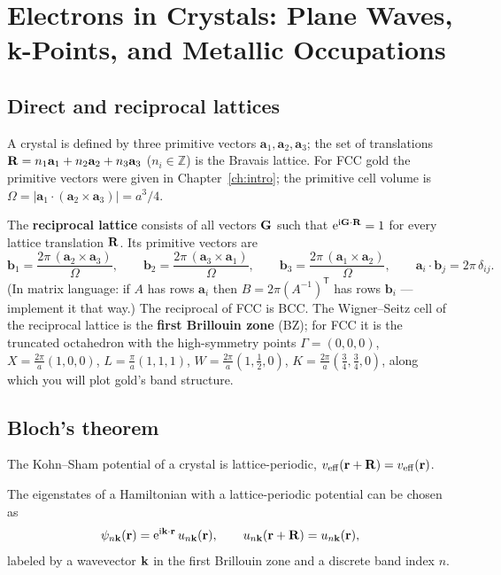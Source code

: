 \chapter{Electrons in Crystals: Plane Waves, k-Points, and Metallic Occupations}
\label{ch:solids}

\section{Direct and reciprocal lattices}

A crystal is defined by three primitive vectors $\mathbf a_1, \mathbf a_2,
\mathbf a_3$; the set of translations $\mathbf{R} = n_1\mathbf a_1 + n_2\mathbf a_2
+ n_3 \mathbf a_3$ ($n_i \in \mathbb Z$) is the Bravais lattice. For FCC gold
the primitive vectors were given in Chapter~\ref{ch:intro}; the primitive
cell volume is $\Omega = |\mathbf a_1 \cdot (\mathbf a_2 \times \mathbf
a_3)| = a^3/4$.

The \textbf{reciprocal lattice} consists of all vectors $\mathbf{G}$ such that
$\mathrm{e}^{\mathrm{i} \mathbf{G}\cdot\mathbf{R}} = 1$ for every lattice translation $\mathbf{R}$. Its
primitive vectors are
\begin{equation}
\mathbf b_1 = \frac{2\pi\, (\mathbf a_2 \times \mathbf a_3)}{\Omega},
\qquad
\mathbf b_2 = \frac{2\pi\, (\mathbf a_3 \times \mathbf a_1)}{\Omega},
\qquad
\mathbf b_3 = \frac{2\pi\, (\mathbf a_1 \times \mathbf a_2)}{\Omega},
\qquad
\mathbf a_i \cdot \mathbf b_j = 2\pi\, \delta_{ij}.
\end{equation}
(In matrix language: if $A$ has rows $\mathbf a_i$ then $B = 2\pi
(A^{-1})^{\mathsf T}$ has rows $\mathbf b_i$ --- implement it that way.) The
reciprocal of FCC is BCC. The Wigner--Seitz cell of the reciprocal lattice is
the \textbf{first Brillouin zone} (BZ); for FCC it is the truncated
octahedron with the high-symmetry points $\Gamma = (0,0,0)$,
$X = \tfrac{2\pi}{a}(1,0,0)$, $L = \tfrac{\pi}{a}(1,1,1)$,
$W = \tfrac{2\pi}{a}(1,\tfrac12,0)$, $K = \tfrac{2\pi}{a}(\tfrac34,
\tfrac34, 0)$, along which you will plot gold's band structure.

\section{Bloch's theorem}

The Kohn--Sham potential of a crystal is lattice-periodic,
$v_{\mathrm{eff}}(\mathbf{r} + \mathbf{R}) = v_{\mathrm{eff}}(\mathbf{r})$.

\begin{theorem}[Bloch]
The eigenstates of a Hamiltonian with a lattice-periodic potential can be
chosen as
\begin{equation}
\psi_{n\mathbf{k}}(\mathbf{r}) = \mathrm{e}^{\mathrm{i} \mathbf{k}\cdot\mathbf{r}}\, u_{n\mathbf{k}}(\mathbf{r}),
\qquad
u_{n\mathbf{k}}(\mathbf{r} + \mathbf{R}) = u_{n\mathbf{k}}(\mathbf{r}),
\label{eq:bloch}
\end{equation}
labeled by a wavevector $\mathbf{k}$ in the first Brillouin zone and a discrete band
index $n$.
\end{theorem}

